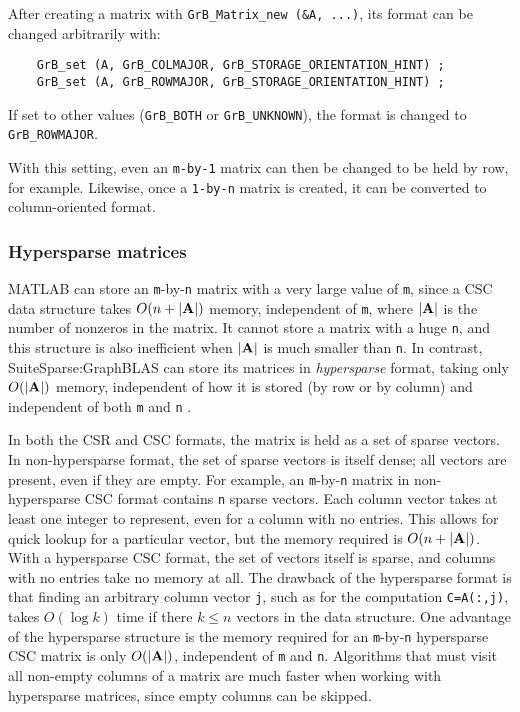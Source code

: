 After creating a matrix with \verb'GrB_Matrix_new (&A, ...)',
its format can be changed arbitrarily with:

    {\footnotesize
    \begin{verbatim}
    GrB_set (A, GrB_COLMAJOR, GrB_STORAGE_ORIENTATION_HINT) ;
    GrB_set (A, GrB_ROWMAJOR, GrB_STORAGE_ORIENTATION_HINT) ; \end{verbatim} }

If set to other values (\verb'GrB_BOTH' or \verb'GrB_UNKNOWN'), the
format is changed to \verb'GrB_ROWMAJOR'.

With this setting, even an \verb'm-by-1' matrix can then be changed to be held
by row, for example.  Likewise, once a \verb'1-by-n' matrix is created, it can
be converted to column-oriented format.

\subsubsection{Hypersparse matrices}
\label{hypersparse}

MATLAB can store an \verb'm'-by-\verb'n' matrix with a very large value of
\verb'm', since a CSC data structure takes $O(n+|{\bf A}|)$ memory, independent
of \verb'm', where $|{\bf A}|$ is the number of nonzeros in the matrix.  It
cannot store a matrix with a huge \verb'n', and this structure is also
inefficient when $|{\bf A}|$ is much smaller than \verb'n'.  In contrast,
SuiteSparse:GraphBLAS can store its matrices in {\em hypersparse} format,
taking only $O(|{\bf A}|)$ memory, independent of how it is stored (by row or
by column) and independent of both \verb'm' and \verb'n'
\cite{BulucGilbert08,BulucGilbert12}.

In both the CSR and CSC formats, the matrix is held as a set of sparse vectors.
In non-hypersparse format, the set of sparse vectors is itself dense; all
vectors are present, even if they are empty.  For example, an
\verb'm'-by-\verb'n' matrix in non-hypersparse CSC format contains \verb'n'
sparse vectors.  Each column vector takes at least one integer to represent,
even for a column with no entries.  This allows for quick lookup for a
particular vector, but the memory required is $O(n+|{\bf A}|)$.  With a
hypersparse CSC format, the set of vectors itself is sparse, and columns with
no entries take no memory at all.  The drawback of the hypersparse format is
that finding an arbitrary column vector \verb'j', such as for the computation
\verb'C=A(:,j)', takes $O(\log k)$ time if there $k \le n$ vectors in the data
structure.  One advantage of the hypersparse structure is the memory required
for an \verb'm'-by-\verb'n' hypersparse CSC matrix is only $O(|{\bf A}|)$,
independent of \verb'm' and \verb'n'.  Algorithms that must visit all non-empty
columns of a matrix are much faster when working with hypersparse matrices,
since empty columns can be skipped.

